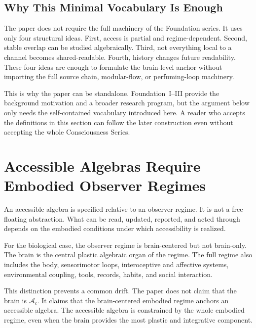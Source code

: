 \documentclass[12pt]{article}
\theoremstyle{definition}
\theoremstyle{remark}
\newcommand{\Ac}{\mathcal A_c}
\begin{document}
\subsection{Why This Minimal Vocabulary Is Enough}

The paper does not require the full machinery of the Foundation series.
It uses only four structural ideas. First, access is partial and
regime-dependent. Second, stable overlap can be studied algebraically.
Third, not everything local to a channel becomes shared-readable.
Fourth, history changes future readability. These four ideas are enough
to formulate the brain-level anchor without importing the full source
chain, modular-flow, or perfuming-loop machinery.

This is why the paper can be standalone. Foundation~I--III provide the
background motivation and a broader research program, but the argument
below only needs the self-contained vocabulary introduced here. A reader
who accepts the definitions in this section can follow the later
construction even without accepting the whole Consciousness Series.

\section{Accessible Algebras Require Embodied Observer Regimes}

An accessible algebra is specified relative to an observer regime. It is
not a free-floating abstraction. What can be read, updated, reported,
and acted through depends on the embodied conditions under which
accessibility is realized.

For the biological case, the observer regime is brain-centered but not
brain-only. The brain is the central plastic algebraic organ of the
regime. The full regime also includes the body, sensorimotor loops,
interoceptive and affective systems, environmental coupling, tools,
records, habits, and social interaction.

This distinction prevents a common drift. The paper does not claim that
the brain is \(\Ac\). It claims that the brain-centered embodied regime
anchors an accessible algebra. The accessible algebra is constrained by
the whole embodied regime, even when the brain provides the most
plastic and integrative component.
\end{document}

